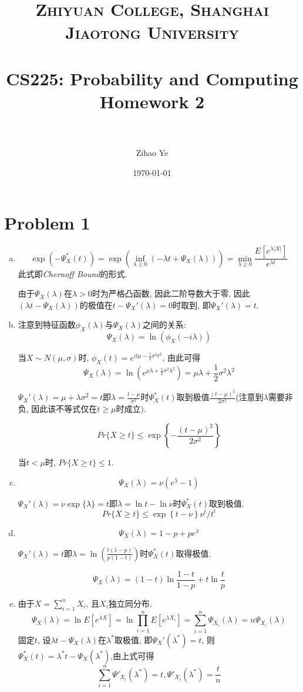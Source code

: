 \documentclass[paper=a4, fontsize=11pt]{scrartcl} %
\title{	
\normalfont \normalsize 
\textsc{Zhiyuan College, Shanghai Jiaotong University} \\ %
\horrule{0.5pt} \\[0.4cm] %
\huge CS225: Probability and Computing Homework 2 \\ %
\horrule{2pt} \\ %
}
\author{Zihao Ye} %
\date{\normalsize\today} %
\numberwithin{equation}{section} %
\numberwithin{figure}{section} %
\numberwithin{table}{section} %
\begin{document}
\maketitle %
\section*{Problem 1}
\begin{enumerate}[(a)]
	\item
    $$\exp\left(-\Psi_X^*(t)\right) = \exp\left(\inf_{\lambda \geq 0}\left(-\lambda t + \Psi_X(\lambda)\right) \right) = \min_{\lambda \geq 0}\frac{E[e^{\lambda|X|}]}{e^{\lambda t}} $$
    此式即\textit{Chernoff Bound}的形式.
    
    由于$\Psi_X(\lambda)$在$\lambda > 0$时为严格凸函数, 因此二阶导数大于零, 因此$(\lambda t - \Psi_X(\lambda))$的极值在$t - \Psi_X'(\lambda) = 0$时取到, 即$\Psi_X'(\lambda) = t$.
    \item
    注意到特征函数$\phi_X(\lambda)$与$\Psi_X(\lambda)$之间的关系:
    $$\Psi_X(\lambda) = \ln\left(\phi_X(-i\lambda)\right) $$
    
    当$X\sim N(\mu, \sigma)$时, $\phi_X(t) = e^{it\mu -\frac{1}{2}\sigma^2t^2}$, 由此可得$$\Psi_X(\lambda) = \ln\left(e^{\mu\lambda + \frac{1}{2}\sigma^2\lambda^2}\right)=\mu\lambda + \frac{1}{2}\sigma^2\lambda^2$$
    
    $ \Psi_X'(\lambda) = \mu + \lambda\sigma^2 = t$即$\lambda = \frac{t - \mu}{\sigma^2}$时$\Psi_X^*(t)$取到极值$\frac{(t-\mu)^2}{2\sigma^2}$(注意到$\lambda$需要非负, 因此该不等式仅在$t \geq \mu$时成立).
    
    $$Pr\{X\geq t\} \leq \exp\left\{-\frac{(t-\mu)^2}{2\sigma^2}\right\}$$	
    
    当$t < \mu$时, $Pr\{X \geq t\} \leq 1$.
    \item
    $$\Psi_X(\lambda) = \nu\left(e^\lambda - 1\right) $$
    
    $\Psi_X'(\lambda) = \nu \exp\{\lambda\} = t$即$\lambda = \ln t - \ln \nu$时$\Psi_X^*(t)$取到极值.
    $$Pr\{X\geq t\} \leq \exp\left\{t - \nu\right\}\nu^t / t^t $$
    \item
    $$\Psi_X(\lambda) = 1-p+pe^{\lambda} $$

	$\Psi_X'(\lambda) = t$即$\lambda = \ln\left(\frac{t(1-p)}{p(1-t)}\right)$时$\Psi_X^*(t)$取得极值.
    
    $$\Psi_X(\lambda) = (1-t)\ln\frac{1-t}{1-p} + t\ln \frac{t}{p} $$
    \item
    由于$X = \sum_{i=1}^{n}X_i$, 且$X_i$独立同分布.
    $$\Psi_X(\lambda) = \ln E[e^{\lambda X}] = \ln \prod_{i=1}^{n}E[e^{\lambda X_i}] = \sum_{i=1}^{n}\Psi_{X_i}(\lambda) = n\Psi_{X_i}(\lambda)$$
    固定$t$, 设$\lambda t - \Psi_X(\lambda)$在$\lambda^*$取极值, 即$\Psi_X'(\lambda^*)=t$, 则$\Psi_X^*(t) = \lambda^*t-\Psi_X(\lambda^*)$,由上式可得$$\sum_{i=1}^{n}\Psi'_{X_i}(\lambda^*)=t, \Psi'_{X_i}(\lambda^*)=\frac{t}{n}$$
    

\end{enumerate}
\end{document}
